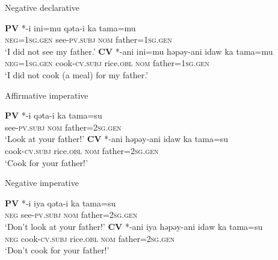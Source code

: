 \begin{exe}
\ex Negative declarative \label{ex:SetII_1}
    \begin{xlist}
    \ex \textbf{PV} *-i
    \gll *ini=mu qəta-i ka tama=mu\\
    \textsc{neg}=\textsc{1sg.gen} see-\textsc{pv.subj} \textsc{nom} father=\textsc{1sg.gen}\\
    \glt `I did not see my father.'
    \ex \textbf{CV} *-ani
    \gll *ini=mu həpəy-ani idaw ka tama=mu\\
    \textsc{neg}=\textsc{1sg.gen} cook-\textsc{cv.subj} rice.\textsc{obl} \textsc{nom} father=\textsc{1sg.gen}\\
    \glt `I did not cook (a meal) for my father.'
    \end{xlist}
\ex Affirmative imperative \label{ex:SetII_2}
    \begin{xlist}
    \ex \textbf{PV} *-i
    \gll *qəta-i ka tama=su\\
    see-\textsc{pv.subj} \textsc{nom} father=\textsc{2sg.gen}\\
    \glt `Look at your father!'
    \ex \textbf{CV} *-ani
    \gll *həpəy-ani idaw ka tama=su\\
    cook-\textsc{cv.subj} rice.\textsc{obl} \textsc{nom} father=\textsc{2sg.gen}\\
    \glt `Cook for your father!'
    \end{xlist}
\ex Negative imperative \label{ex:SetII_3}
    \begin{xlist}
    \ex \textbf{PV} *-i
    \gll *iya qəta-i ka tama=su\\
    \textsc{neg} see-\textsc{pv.subj} \textsc{nom} father=\textsc{2sg.gen}\\
    \glt `Don't look at your father!'
    \ex \textbf{CV} *-ani
    \gll *iya həpəy-ani idaw ka tama=su\\
    \textsc{neg} cook-\textsc{cv.subj} rice.\textsc{obl} \textsc{nom} father=\textsc{2sg.gen}\\
    \glt `Don't cook for your father!'
    \end{xlist}
\end{exe}

